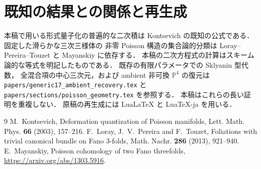 \documentclass[11pt,a4paper]{ltjsarticle}
\newcommand{\PP}{\mathbb P}
\begin{document}
\section{既知の結果との関係と再生成}
本稿で用いる形式量子化の普遍的な二次積は
Kontsevich の既知の公式である．固定した滑らかな三次三様体の
非零 Poisson 構造の集合論的分類は
Loray--Pereira--Touzet と Mayanskiy に依存する．
本稿の二次方程式の計算はスキーム論的な等式を明記したものである．
既存の有限パラメータでの Sklyanin 型代数，
全混合項の中心三次元，および ambient 非可換 $\PP^4$ の復元は
\texttt{papers/generic17\_ambient\_recovery.tex} と
\texttt{papers/sections/poisson\_geometry.tex} を参照する．
本稿はこれらの長い証明を重複しない．
原稿の再生成には LuaLaTeX と LuaTeX-ja を用いる．

\begin{thebibliography}{9}
M.~Kontsevich,
Deformation quantization of Poisson manifolds,
Lett. Math. Phys. \textbf{66} (2003), 157--216.
F.~Loray, J.~V.~Pereira and F.~Touzet,
Foliations with trivial canonical bundle on Fano 3-folds,
Math. Nachr. \textbf{286} (2013), 921--940.
E.~Mayanskiy,
Poisson cohomology of two Fano threefolds,
\url{https://arxiv.org/abs/1303.5916}.
\end{thebibliography}
\end{document}
